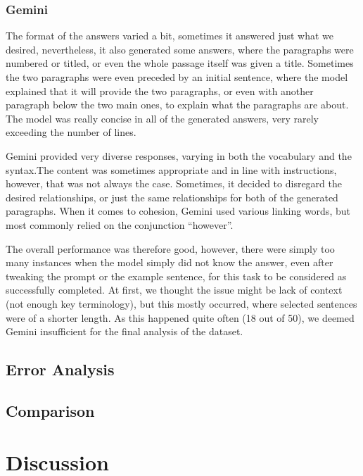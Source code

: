 \documentclass[fleqn,moreauthors,10pt]{ds_report}
\begin{document}
\subsubsection*{Gemini}
The format of the answers varied a bit, sometimes it answered just what we desired, nevertheless, it also generated some answers, where the paragraphs were numbered or titled, or even the whole passage itself was given a title. Sometimes the two paragraphs were even preceded by an initial sentence, where the model explained that it will provide the two paragraphs, or even with another paragraph below the two main ones, to explain what the paragraphs are about. The model was really concise in all of the generated answers, very rarely exceeding the number of lines.

Gemini provided very diverse responses, varying in both the vocabulary and the syntax.The content was sometimes appropriate and in line with instructions, however, that was not always the case. Sometimes, it decided to disregard the desired relationships, or just the same relationships for both of the generated paragraphs. When it comes to cohesion, Gemini used various linking words, but most commonly relied on the conjunction “however”.

The overall performance was therefore good, however, there were simply too many instances when the model simply did not know the answer, even after tweaking the prompt or the example sentence, for this task to be considered as successfully completed. At first, we thought the issue might be lack of context (not enough key terminology), but this mostly occurred, where selected sentences were of a shorter length. As this happened quite often (18 out of 50), we deemed Gemini insufficient for the final analysis of the dataset.


\subsection*{Error Analysis}

\subsection*{Comparison}


\section*{Discussion}
\end{document}
